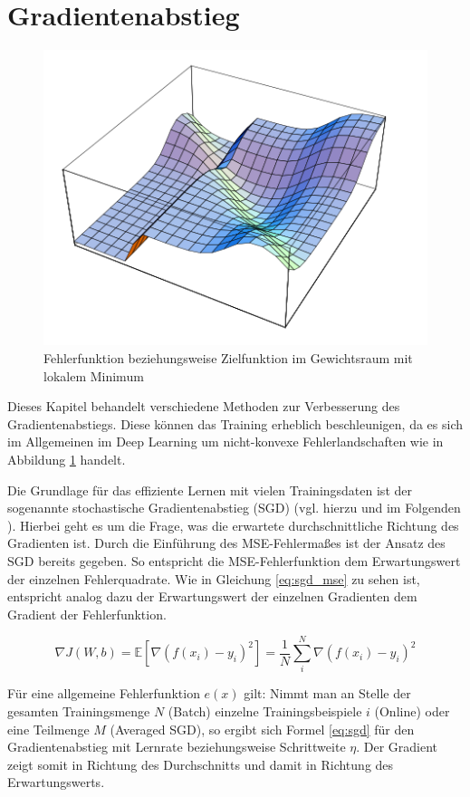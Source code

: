 \section{Gradientenabstieg}
\label{ch:gradient}
\begin{figure}
\centering
\includegraphics[width=0.5\linewidth]{images/4_Gradient2}
\caption[]{Fehlerfunktion beziehungsweise Zielfunktion im Gewichtsraum mit lokalem Minimum \cite[siehe][S. 155]{Rojas1996} }%
\label{fig:4_Gradient}
\end{figure}
Dieses Kapitel behandelt verschiedene Methoden zur Verbesserung des Gradientenabstiegs. Diese können das Training erheblich beschleunigen, da es sich im Allgemeinen im Deep Learning um nicht-konvexe Fehlerlandschaften wie in Abbildung \ref{fig:4_Gradient} handelt.

Die Grundlage für das effiziente Lernen mit vielen Trainingsdaten ist der sogenannte stochastische Gradientenabstieg (SGD) (vgl. hierzu und im Folgenden \cite{Bottou1998}). Hierbei geht es um die Frage, was die erwartete durchschnittliche Richtung des Gradienten ist. Durch die Einführung des MSE-Fehlermaßes ist der Ansatz des SGD bereits gegeben. So entspricht die MSE-Fehlerfunktion dem Erwartungswert der einzelnen Fehlerquadrate. Wie in Gleichung \ref{eq:sgd_mse} zu sehen ist, entspricht analog dazu der Erwartungswert der einzelnen Gradienten dem Gradient der Fehlerfunktion.

\begin{equation}
\label{eq:sgd_mse} 
\nabla J(W,b) =  \mathbb{E}[\nabla (f(x_i) - y_i)^2] = \frac{1}{N}\sum_{i}^{N} \nabla (f(x_i) - y_i)^2
\end{equation}

Für eine allgemeine Fehlerfunktion $e(x)$ gilt: Nimmt man an Stelle der gesamten Trainingsmenge $N$ (Batch) einzelne Trainingsbeispiele $i$ (Online) oder eine Teilmenge $M$ (Averaged SGD), so ergibt sich Formel \ref{eq:sgd} für den Gradientenabstieg mit Lernrate beziehungsweise Schrittweite $\eta$. Der Gradient zeigt somit in Richtung des Durchschnitts und damit in Richtung des Erwartungswerts. 


